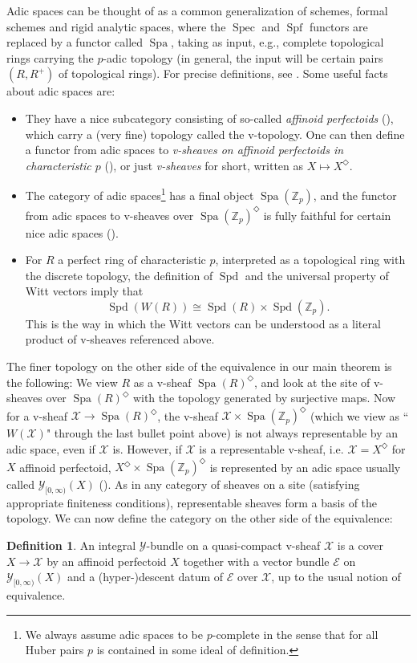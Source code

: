 \documentclass[10pt,twoside]{article}
\numberwithin{equation}{section}
\theoremstyle{plain}
\theoremstyle{definition}
\newtheorem{mydef}[mythm]{Definition}
\DeclareMathOperator{\Spec}{Spec}
\DeclareMathOperator{\Spa}{Spa}
\DeclareMathOperator{\Spf}{Spf}
\DeclareMathOperator{\Spd}{Spd}
\newcommand{\ZZ}{\mathbb{Z}}
\newcommand{\MCE}{\mathcal{E}}
\newcommand{\MCX}{\mathcal{X}}
\newcommand{\MCY}{\mathcal{Y}}
\let \diamond \Diamond
\newcommand{\Yco}{\MCY_{[0,\infty)}}
\begin{document}
Adic spaces can be thought of as a common generalization of schemes, formal schemes and rigid analytic spaces, where the \(\Spec\) and \(\Spf\) functors are replaced by a functor called \(\Spa\), taking as input, e.g., complete topological rings carrying the \(p\)-adic topology (in general, the input will be certain pairs \((R,R^+)\) of topological rings). For precise definitions, see \cite[Sections 1-3]{SW20}. Some useful facts about adic spaces are:
\begin{itemize}
    \item They have a nice subcategory consisting of so-called \emph{affinoid perfectoids} (\cite[Definition 7.1.2 and Remark 7.1.3]{SW20}), which carry a (very fine) topology called the v-topology. One can then define a functor from adic spaces to \emph{v-sheaves on affinoid perfectoids in characteristic \(p\)} (\cite[Section 18.1]{SW20}), or just \emph{v-sheaves} for short, written as \(X\mapsto X^\diamond\).
    \item The category of adic spaces\footnote{We always assume adic spaces to be \(p\)-complete in the sense that for all Huber pairs \(p\) is contained in some ideal of definition.} has a final object \(\Spa(\ZZ_p)\), and the functor from adic spaces to v-sheaves over \(\Spa(\ZZ_p)^\diamond\) is fully faithful for certain nice adic spaces (\cite[Proposition 10.2.3, Proposition 18.3.1 and Proposition 18.4.1]{SW20}).
    \item For \(R\) a perfect ring of characteristic \(p\), interpreted as a topological ring with the discrete topology, the definition of \(\Spd\) and the universal property of Witt vectors imply that
    \[\Spd(W(R))\cong \Spd(R)\times \Spd(\ZZ_p).\]
    This is the way in which the Witt vectors can be understood as a literal product of v-sheaves referenced above.
\end{itemize}

The finer topology on the other side of the equivalence in our main theorem is the following: We view \(R\) as a v-sheaf \(\Spa(R)^\diamond\), and look at the site of v-sheaves over \(\Spa(R)^\diamond\) with the topology generated by surjective maps. Now for a v-sheaf \(\MCX\to \Spa(R)^\diamond\), the v-sheaf \(\MCX\times\Spa(\ZZ_p)^\diamond\) (which we view as ``\(W(\MCX)\)" through the last bullet point above) is not always representable by an adic space, even if \(\MCX\) is. However, if \(\MCX\) is a representable v-sheaf, i.e. \(\MCX = X^\diamond\) for \(X\) affinoid perfectoid, \(X^\diamond\times\Spa(\ZZ_p)^\diamond\) is represented by an adic space usually called \(\Yco(X)\) (\cite[Proposition 11.2.1]{SW20}). As in any category of sheaves on a site (satisfying appropriate finiteness conditions), representable sheaves form a basis of the topology. We can now define the category on the other side of the equivalence:
\begin{mydef}
    An integral \(\MCY\)-bundle on a quasi-compact v-sheaf \(\MCX\) is a cover \(X\to \MCX\) by an affinoid perfectoid \(X\) together with a vector bundle \(\MCE\) on \(\Yco(X)\) and a (hyper-)descent datum of \(\MCE\) over \(\MCX\), up to the usual notion of equivalence.
\end{mydef}
\end{document}
